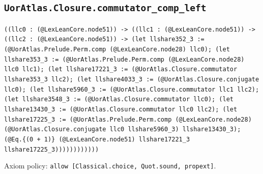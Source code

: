 \documentclass[11pt]{article}
\begin{document}
\subsection*{\texttt{UorAtlas.Closure.commutator\_comp\_left}}
\noindent\texttt{((llc0 : (@LexLeanCore.node51)) -> ((llc1 : (@LexLeanCore.node51)) -> ((llc2 : (@LexLeanCore.node51)) -> (let llshare352\_3 := (@UorAtlas.Prelude.Perm.comp (@LexLeanCore.node28) llc0); (let llshare353\_3 := (@UorAtlas.Prelude.Perm.comp (@LexLeanCore.node28) llc0 llc1); (let llshare17221\_3 := (@UorAtlas.Closure.commutator llshare353\_3 llc2); (let llshare4033\_3 := (@UorAtlas.Closure.conjugate llc0); (let llshare5960\_3 := (@UorAtlas.Closure.commutator llc1 llc2); (let llshare3548\_3 := (@UorAtlas.Closure.commutator llc0); (let llshare13430\_3 := (@UorAtlas.Closure.commutator llc0 llc2); (let llshare17225\_3 := (@UorAtlas.Prelude.Perm.comp (@LexLeanCore.node28) (@UorAtlas.Closure.conjugate llc0 llshare5960\_3) llshare13430\_3); (@Eq.\{(0 + 1)\} (@LexLeanCore.node51) llshare17221\_3 llshare17225\_3))))))))))))}\par
\noindent Axiom policy: \texttt{allow [Classical.choice, Quot.sound, propext]}.\par
\end{document}
